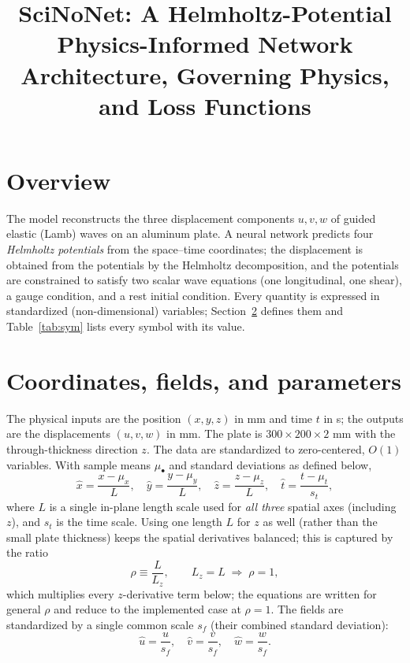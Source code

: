 \documentclass[11pt]{article}
\title{\vspace{-1.5em}SciNoNet: A Helmholtz-Potential Physics-Informed Network\\[-0.2em]
\large Architecture, Governing Physics, and Loss Functions}
\author{}
\date{}
\newcommand{\xh}{\hat{x}} \newcommand{\yh}{\hat{y}} \newcommand{\zh}{\hat{z}}
\newcommand{\tht}{\hat{t}}
\newcommand{\uh}{\hat{u}} \newcommand{\vh}{\hat{v}} \newcommand{\wh}{\hat{w}}
\begin{document}
\maketitle
\vspace{-3em}

\section{Overview}
The model reconstructs the three displacement components $u,v,w$ of guided
elastic (Lamb) waves on an aluminum plate. A neural network predicts four
\emph{Helmholtz potentials} from the space--time coordinates; the displacement is
obtained from the potentials by the Helmholtz decomposition, and the potentials
are constrained to satisfy two scalar wave equations (one longitudinal, one
shear), a gauge condition, and a rest initial condition. Every quantity is
expressed in standardized (non-dimensional) variables; Section~\ref{sec:std}
defines them and Table~\ref{tab:sym} lists every symbol with its value.

\section{Coordinates, fields, and parameters}
\label{sec:std}
The physical inputs are the position $(x,y,z)$ in mm and time $t$ in s; the
outputs are the displacements $(u,v,w)$ in mm. The plate is $300\times200\times2$
mm with the through-thickness direction $z$. The data are standardized to
zero-centered, $O(1)$ variables. With sample means $\mu_\bullet$ and standard
deviations as defined below,
\begin{equation}
\xh=\frac{x-\mu_x}{L},\quad \yh=\frac{y-\mu_y}{L},\quad
\zh=\frac{z-\mu_z}{L},\quad \tht=\frac{t-\mu_t}{s_t},
\label{eq:coordstd}
\end{equation}
where $L$ is a single in-plane length scale used for \emph{all three} spatial
axes (including $z$), and $s_t$ is the time scale. Using one length $L$ for $z$
as well (rather than the small plate thickness) keeps the spatial derivatives
balanced; this is captured by the ratio
\begin{equation}
\rho \equiv \frac{L}{L_z},\qquad L_z=L \;\Rightarrow\; \rho=1,
\end{equation}
which multiplies every $z$-derivative term below; the equations are written for
general $\rho$ and reduce to the implemented case at $\rho=1$. The fields are
standardized by a single common scale $s_f$ (their combined standard deviation):
\begin{equation}
\uh=\frac{u}{s_f},\quad \vh=\frac{v}{s_f},\quad \wh=\frac{w}{s_f}.
\label{eq:fieldstd}
\end{equation}
\end{document}

